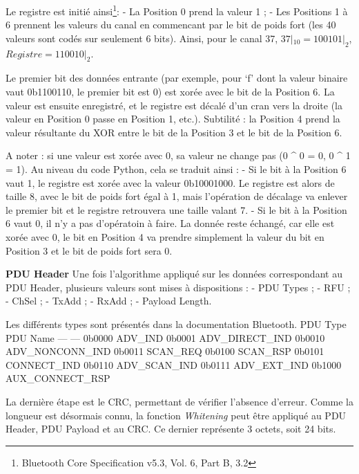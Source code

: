 Le registre est initié ainsi\footnote{Bluetooth Core Specification v5.3,
  Vol. 6, Part B, 3.2}: - La Position 0 prend la valeur 1 ; - Les
Positions 1 à 6 prennent les valeurs du canal en commencant par le bit
de poids fort (les 40 valeurs sont codés sur seulement 6 bits). Ainsi,
pour le canal 37, \(37 |_{10} = 100101|_2\), \(Registre = 110010|_2\).

Le premier bit des données entrante (par exemple, pour `f' dont la
valeur binaire vaut 0b1100110, le premier bit est 0) est xorée avec le
bit de la Position 6. La valeur est ensuite enregistré, et le registre
est décalé d'un cran vers la droite (la valeur en Position 0 passe en
Position 1, etc.). Subtilité : la Position 4 prend la valeur résultante
du XOR entre le bit de la Position 3 et le bit de la Position 6.

A noter : si une valeur est xorée avec 0, sa valeur ne change pas (0
\^{} 0 = 0, 0 \^{} 1 = 1). Au niveau du code Python, cela se traduit
ainsi : - Si le bit à la Position 6 vaut 1, le registre est xorée avec
la valeur 0b10001000. Le registre est alors de taille 8, avec le bit de
poids fort égal à 1, mais l'opération de décalage va enlever le premier
bit et le registre retrouvera une taille valant 7. - Si le bit à la
Position 6 vaut 0, il n'y a pas d'opératoin à faire. La donnée reste
échangé, car elle est xorée avec 0, le bit en Position 4 va prendre
simplement la valeur du bit en Position 3 et le bit de poids fort sera
0.

\textbf{PDU Header} Une fois l'algorithme appliqué sur les données
correspondant au PDU Header, plusieurs valeurs sont mises à dispositions
: - PDU Types ; - RFU ; - ChSel ; - TxAdd ; - RxAdd ; - Payload Length.

Les différents types sont présentés dans la documentation Bluetooth.
\textbar{} PDU Type \textbar{} PDU Name \textbar{} \textbar{} ---
\textbar{} --- \textbar{} \textbar{} 0b0000 \textbar{} ADV\_IND
\textbar{} \textbar{} 0b0001 \textbar{} ADV\_DIRECT\_IND \textbar{}
\textbar{} 0b0010 \textbar{} ADV\_NONCONN\_IND \textbar{} \textbar{}
0b0011 \textbar{} SCAN\_REQ \textbar{} \textbar{} 0b0100 \textbar{}
SCAN\_RSP \textbar{} \textbar{} 0b0101 \textbar{} CONNECT\_IND
\textbar{} \textbar{} 0b0110 \textbar{} ADV\_SCAN\_IND \textbar{}
\textbar{} 0b0111 \textbar{} ADV\_EXT\_IND \textbar{} \textbar{} 0b1000
\textbar{} AUX\_CONNECT\_RSP \textbar{}

La dernière étape est le CRC, permettant de vérifier l'absence d'erreur.
Comme la longueur est désormais connu, la fonction \emph{Whitening} peut
être appliqué au PDU Header, PDU Payload et au CRC. Ce dernier
représente 3 octets, soit 24 bits.

